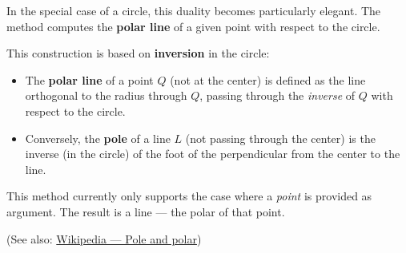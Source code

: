 \medskip
\noindent
In the special case of a circle, this duality becomes particularly elegant. The method  computes the \textbf{polar line} of a given point with respect to the circle.

\medskip
\noindent
This construction is based on \textbf{inversion} in the circle:
\begin{itemize}
  \item The \textbf{polar line} of a point $Q$ (not at the center) is defined as the line orthogonal to the radius through $Q$, passing through the \emph{inverse} of $Q$ with respect to the circle.
  \item Conversely, the \textbf{pole} of a line $L$ (not passing through the center) is the inverse (in the circle) of the foot of the perpendicular from the center to the line.
\end{itemize}

\noindent
This method currently only supports the case where a \emph{point} is provided as argument. The result is a line — the polar of that point.

\medskip
\noindent
(See also: \href{https://en.wikipedia.org/wiki/Pole_and_polar}{Wikipedia — Pole and polar})

\vspace{1em}


\begin{tkzexample}[latex = .5\textwidth]
\begin{center}
\end{center}
\end{tkzexample}

